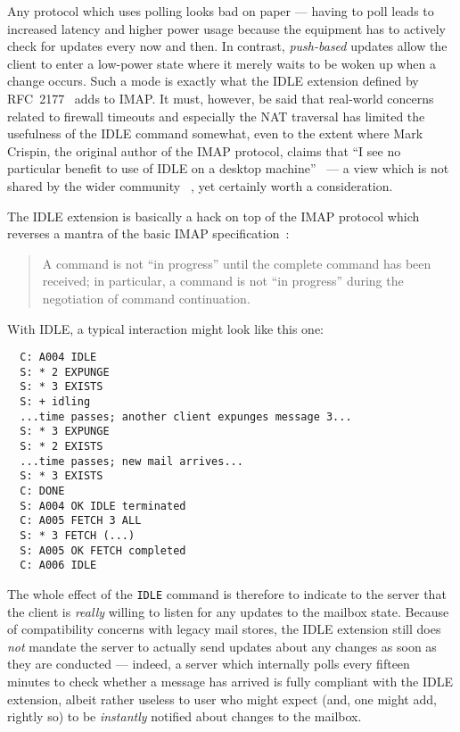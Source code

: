 \documentclass[trojita]{subfiles}
\begin{document}
Any protocol which uses polling looks bad on paper --- having to poll leads to increased latency and higher power usage
because the equipment has to actively check for updates every now and then.  In contrast, {\em push-based} updates allow
the client to enter a low-power state where it merely waits to be woken up when a change occurs.  Such a mode is exactly
what the IDLE extension defined by RFC~2177~\cite{rfc2177} adds to IMAP.  It must, however, be said that real-world
concerns related to firewall timeouts and especially the NAT traversal has limited the usefulness of the IDLE command
somewhat, even to the extent where Mark Crispin, the original author of the IMAP protocol, claims that ``I see no
particular benefit to use of IDLE on a desktop machine''~\cite{crispin-idle-useless} --- a view which is not shared by
the wider community~\cite{tss-idle-keepalive} \cite{android-idle}, yet certainly worth a consideration.

The IDLE extension is basically a hack on top of the IMAP protocol which reverses a mantra of the basic IMAP
specification~\cite[p. 72]{rfc3501}:

\begin{quote}
  A command is not ``in progress'' until the complete command has been received; in particular, a command is not ``in
  progress'' during the negotiation of command continuation.
\end{quote}

With IDLE, a typical interaction might look like this one:

\begin{verbatim}
  C: A004 IDLE
  S: * 2 EXPUNGE
  S: * 3 EXISTS
  S: + idling
  ...time passes; another client expunges message 3...
  S: * 3 EXPUNGE
  S: * 2 EXISTS
  ...time passes; new mail arrives...
  S: * 3 EXISTS
  C: DONE
  S: A004 OK IDLE terminated
  C: A005 FETCH 3 ALL
  S: * 3 FETCH (...)
  S: A005 OK FETCH completed
  C: A006 IDLE
\end{verbatim}

The whole effect of the {\tt IDLE} command is therefore to indicate to the server that the client is {\em really}
willing to listen for any updates to the mailbox state.  Because of compatibility concerns with legacy mail stores, the
IDLE extension still does {\em not} mandate the server to actually send updates about any changes as soon as they are
conducted --- indeed, a server which internally polls every fifteen minutes to check whether a message has arrived is
fully compliant with the IDLE extension, albeit rather useless to user who might expect (and, one might add, rightly so)
to be {\em instantly} notified about changes to the mailbox.
\end{document}

